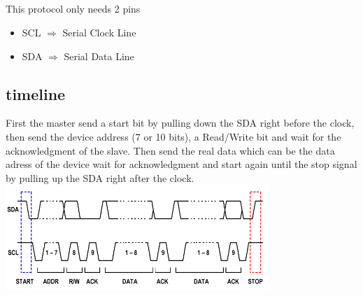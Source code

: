 \documentclass[
10pt,
a4paper,
]{article}
\begin{document}
\subsection{}
This protocol only needs 2 pins
\begin{itemize}
	\item SCL $\Rightarrow$ Serial Clock Line\\
	\item SDA $\Rightarrow$ Serial Data Line
\end{itemize}
\subsection{timeline}
First the master send a start bit by pulling down the SDA right before the clock, then send the device address (7 or 10 bits), a Read/Write bit and wait for the acknowledgment of the slave. Then send the real data which can be the data adress of the device wait for acknowledgment and start again until the stop signal by pulling up the SDA right after the clock. 
\includegraphics[width=10cm]{i2c.png}


\vskip2.5cm
\end{document}
